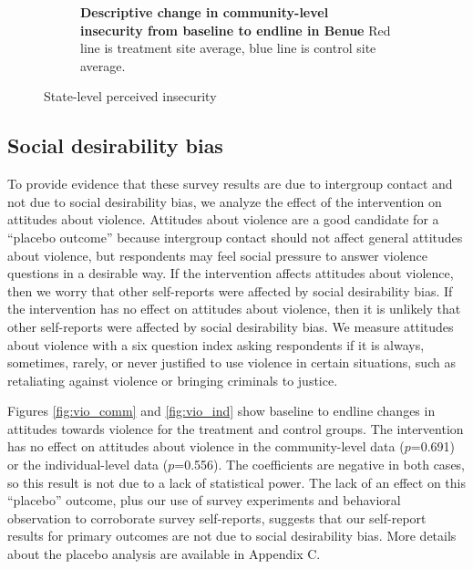 \documentclass[11pt]{article}
\begin{document}
\begin{figure}[H]
\begin{subfigure}[b]{.48\textwidth}
        \caption{\textbf{Descriptive change in community-level insecurity from baseline to endline in Benue} Red line is treatment site average, blue line is control site average.}
        \label{fig:in_ben}
    \end{subfigure}
    \caption{State-level perceived insecurity}
\end{figure}

\hypertarget{social-desirability-bias}{%
\subsection{Social desirability bias}\label{social-desirability-bias}}

To provide evidence that these survey results are due to intergroup
contact and not due to social desirability bias, we analyze the effect
of the intervention on attitudes about violence. Attitudes about
violence are a good candidate for a ``placebo outcome'' because
intergroup contact should not affect general attitudes about violence,
but respondents may feel social pressure to answer violence questions in
a desirable way. If the intervention affects attitudes about violence,
then we worry that other self-reports were affected by social
desirability bias. If the intervention has no effect on attitudes about
violence, then it is unlikely that other self-reports were affected by
social desirability bias. We measure attitudes about violence with a six
question index asking respondents if it is always, sometimes, rarely, or
never justified to use violence in certain situations, such as
retaliating against violence or bringing criminals to justice.

Figures \ref{fig:vio_comm} and \ref{fig:vio_ind} show baseline to
endline changes in attitudes towards violence for the treatment and
control groups. The intervention has no effect on attitudes about
violence in the community-level data (\(p\)=0.691) or the
individual-level data (\(p\)=0.556). The coefficients are negative in
both cases, so this result is not due to a lack of statistical power.
The lack of an effect on this ``placebo'' outcome, plus our use of
survey experiments and behavioral observation to corroborate survey
self-reports, suggests that our self-report results for primary outcomes
are not due to social desirability bias. More details about the placebo
analysis are available in Appendix C.
\end{document}
